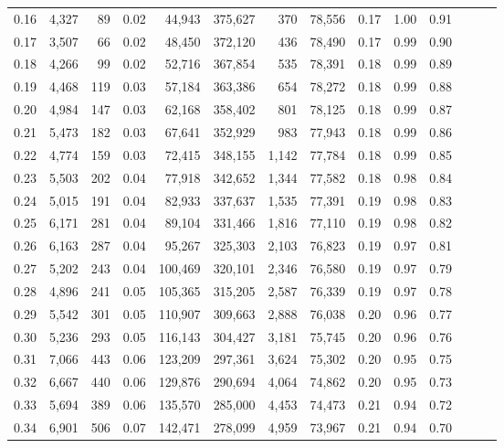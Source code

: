 \begin{tabular}{rrrrrrrrrrrrrr}
0.16 &  4,327 &     89 &  0.02 &   44,943 &  375,627 &     370 &  78,556 &  0.17 &  1.00 &      0.91 \\
0.17 &  3,507 &     66 &  0.02 &   48,450 &  372,120 &     436 &  78,490 &  0.17 &  0.99 &      0.90 \\
0.18 &  4,266 &     99 &  0.02 &   52,716 &  367,854 &     535 &  78,391 &  0.18 &  0.99 &      0.89 \\
0.19 &  4,468 &    119 &  0.03 &   57,184 &  363,386 &     654 &  78,272 &  0.18 &  0.99 &      0.88 \\
0.20 &  4,984 &    147 &  0.03 &   62,168 &  358,402 &     801 &  78,125 &  0.18 &  0.99 &      0.87 \\
0.21 &  5,473 &    182 &  0.03 &   67,641 &  352,929 &     983 &  77,943 &  0.18 &  0.99 &      0.86 \\
0.22 &  4,774 &    159 &  0.03 &   72,415 &  348,155 &   1,142 &  77,784 &  0.18 &  0.99 &      0.85 \\
0.23 &  5,503 &    202 &  0.04 &   77,918 &  342,652 &   1,344 &  77,582 &  0.18 &  0.98 &      0.84 \\
0.24 &  5,015 &    191 &  0.04 &   82,933 &  337,637 &   1,535 &  77,391 &  0.19 &  0.98 &      0.83 \\
0.25 &  6,171 &    281 &  0.04 &   89,104 &  331,466 &   1,816 &  77,110 &  0.19 &  0.98 &      0.82 \\
0.26 &  6,163 &    287 &  0.04 &   95,267 &  325,303 &   2,103 &  76,823 &  0.19 &  0.97 &      0.81 \\
0.27 &  5,202 &    243 &  0.04 &  100,469 &  320,101 &   2,346 &  76,580 &  0.19 &  0.97 &      0.79 \\
0.28 &  4,896 &    241 &  0.05 &  105,365 &  315,205 &   2,587 &  76,339 &  0.19 &  0.97 &      0.78 \\
0.29 &  5,542 &    301 &  0.05 &  110,907 &  309,663 &   2,888 &  76,038 &  0.20 &  0.96 &      0.77 \\
0.30 &  5,236 &    293 &  0.05 &  116,143 &  304,427 &   3,181 &  75,745 &  0.20 &  0.96 &      0.76 \\
0.31 &  7,066 &    443 &  0.06 &  123,209 &  297,361 &   3,624 &  75,302 &  0.20 &  0.95 &      0.75 \\
0.32 &  6,667 &    440 &  0.06 &  129,876 &  290,694 &   4,064 &  74,862 &  0.20 &  0.95 &      0.73 \\
0.33 &  5,694 &    389 &  0.06 &  135,570 &  285,000 &   4,453 &  74,473 &  0.21 &  0.94 &      0.72 \\
0.34 &  6,901 &    506 &  0.07 &  142,471 &  278,099 &   4,959 &  73,967 &  0.21 &  0.94 &      0.70 \\

\end{tabular}
